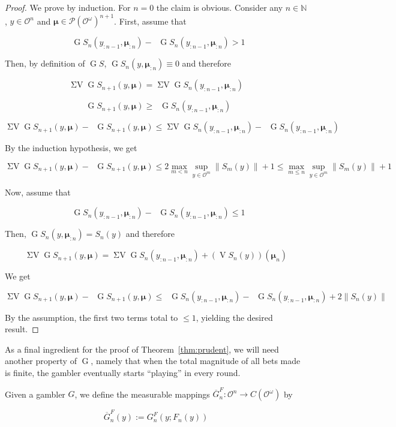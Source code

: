 \documentclass[11pt]{article}
\theoremstyle{definition}
\theoremstyle{plain}
\newcommand{\Nats}{\mathbb{N}}
\newcommand{\N}[1]{\lVert #1 \rVert}
\newcommand{\PM}{\mathcal{P}}
\newcommand{\Ob}{\mathcal{O}}
\newcommand{\OO}{\Ob^\omega}
\newcommand{\PMO}{\PM(\OO)}
\newcommand{\CO}{C(\OO)}
\DeclareMathOperator{\V}{V}
\DeclareMathOperator{\SV}{\Sigma V}
\DeclareMathOperator{\SVM}{\Sigma V_{\min}}
\DeclareMathOperator{\SVX}{\Sigma V_{\max}}
\DeclareMathOperator{\PG}{G}
\newcommand{\BM}{\bm{\mu}}
\begin{document}
\begin{proof}

We prove by induction. For $n=0$ the claim is obvious. Consider any ${n \in \Nats}$, $y \in \Ob^{n}$ and $\BM \in \PMO^{n+1}$. First, assume that

$$\SVX \PG{S}_n(y_{:n-1},\BM_{:n}) - \SVM \PG{S}_n(y_{:n-1},\BM_{:n}) > 1$$

Then, by definition of ${\PG{S}}$, ${\PG{S}_n}(y,\BM_{:n}) \equiv 0$ and therefore

$$\SV \PG{S}_{n+1}(y,\BM)=\SV \PG{S}_n(y_{:n-1},\BM_{:n})$$

$$\SVM \PG{S}_{n+1}(y,\BM) \geq \SVM \PG{S}_n(y_{:n-1},\BM_{:n})$$

$$\SV \PG{S}_{n+1}(y,\BM) - \SVM \PG{S}_{n+1}(y,\BM) \leq \SV \PG{S}_n(y_{:n-1},\BM_{:n}) - \SVM \PG{S}_n(y_{:n-1},\BM_{:n}) $$

By the induction hypothesis, we get

$$\SV \PG{S}_{n+1}(y,\BM) - \SVM \PG{S}_{n+1}(y,\BM) \leq  2 \max_{m < n} \sup_{y \in \Ob^m} \N{S_m(y)}  + 1 \leq \max_{m \leq n} \sup_{y \in \Ob^m} \N{S_m(y)}  + 1$$

Now, assume that 

$$\SVX \PG{S}_n(y_{:n-1},\BM_{:n}) - \SVM \PG{S}_n(y_{:n-1},\BM_{:n}) \leq 1$$

Then, ${\PG{S}_n}(y,\BM_{:n}) = {S_n}(y)$ and therefore

$$\SV \PG{S}_{n+1}(y,\BM)=\SV \PG{S}_n(y_{:n-1},\BM_{:n}) + (\V{S}_n(y))(\BM_n)$$

We get

$$\SV \PG{S}_{n+1}(y,\BM) - \SVM \PG{S}_{n+1}(y,\BM) \leq \SVX \PG{S}_n(y_{:n-1},\BM_{:n}) - \SVM \PG{S}_n(y_{:n-1},\BM_{:n}) + 2 \N{S_n(y)}$$

By the assumption, the first two terms total to ${\leq 1}$, yielding the desired result.
\end{proof}

As a final ingredient for the proof of Theorem~\ref{thm:prudent}, we will need another property of $\PG$, namely that when the total magnitude of all bets made is finite, the gambler eventually starts \enquote{playing} in every round.

Given a gambler $G$, we define the measurable mappings $\overline{G}^F_n: \Ob^n \rightarrow \CO$ by

\begin{equation}
\overline{G}^F_n(y):=G^F_n(y;F_n(y))
\end{equation}
\end{document}
